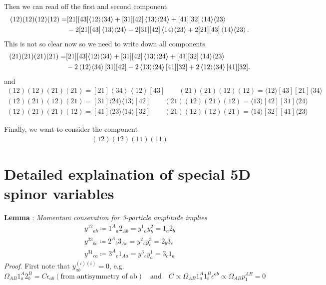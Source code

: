 \documentclass[12pt]{article}
\newcommand{\avg}[1]{\langle #1 \rangle}
\newcommand{\doubleavg}[2]{\left\langle #1 \right\rangle\!\left\langle #2 \right\rangle}
\begin{document}
Then we can read off the first and second component
\begin{align}
    (12)(12)(12)(12)=&[21][43]\avg{12}\avg{34}+[31][42]\doubleavg{13}{24}+[41][32]\doubleavg{14}{23}\notag\\
    &-2[21][43]\doubleavg{13}{24}-2[31][42]\doubleavg{14}{23}+2[21][43]\doubleavg{14}{23}.
\end{align}
This is not so clear now so we need to write down all components
\begin{align}
    (21)(21)(21)(21)=&[21][43]\avg{12}\avg{34}+[31][42]\doubleavg{13}{24}+[41][32]\doubleavg{14}{23}\notag\\
    &-2\doubleavg{12}{34}[31][42]-2\doubleavg{13}{24}[41][32]+2\doubleavg{12}{34}[41][32].
\end{align}
and
\begin{gather}
    (12)(12)(21)(21)=[21]\!\doubleavg{34}{12}\![43]\qquad (21)(21)(12)(12)=\avg{12}[43][21]\avg{34}\\
    (12)(21)(12)(21)=[31]\avg{24}\avg{13}[42]\qquad (21)(12)(21)(12)=\avg{13}[42][31]\avg{24}\\
    (12)(21)(21)(12)=[41]\avg{23}\avg{14}[32]\qquad (21)(12)(12)(21)=\avg{14}[32][41]\avg{23}
\end{gather}

Finally, we want to consider the component
\begin{gather}
    (12)(12)(11)(11)
\end{gather}
\appendix
\section{Detailed explaination of special 5D spinor variables}
\textbf{Lemma} : \textit{Momentum consevation for 3-particle amplitude implies}
\begin{gather}
    y^{12}{}_{ab}\coloneqq 1^A{}_a2_{Ab}=y^1{}_ay^2_b=1_a2_b\\
    y^{23}{}_{bc}\coloneqq 2^A{}_b3_{Ac}=y^2{}_by^3_c=2_b3_c\\
    y^{31}{}_{ca}\coloneqq 3^A{}_c1_{Aa}=y^3{}_cy^1_a=3_c1_a
\end{gather}
\noindent
\textit{Proof}. First note that $y^{(i)(i)}_{ab}=0$, e.g.
\begin{equation}
    \Omega_{AB}1^A_a2^B_b=C\epsilon_{ab} (\text{from antisymmetry of ab})\quad \text{and} \quad C \propto \Omega_{AB}1^A_a1^B_b\epsilon^{ab}\propto \Omega_{AB}p_1^{AB}=0
\end{equation}
\end{document}
